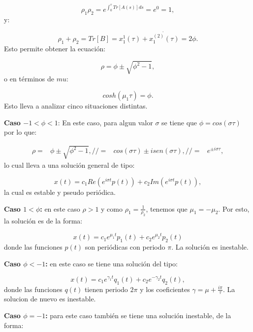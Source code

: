 \documentclass[a4paper,10pt]{report}
\begin{document}
\begin{equation}
\rho_1 \rho_2 = e^{\int_0^\tau Tr[A(s)]ds} = e^0 = 1,
\end{equation} y:

\begin{equation}
\rho_1 + \rho_2 = Tr[B] =x_1^1(\tau)+ \dot{x_1^{(2)}(\tau)} = 2\phi.
\end{equation} Esto permite obtener la ecuación:

\begin{equation}
\rho = \phi \pm \sqrt{\phi^2 -1},
\end{equation} o en términos de $mu$:

\begin{equation}
cosh(\mu_1 \tau) = \phi.
\end{equation} Esto lleva a analizar cinco situaciones distintas.

\textbf{Caso $ -1 < \phi < 1$}: En este caso, para algun valor $\sigma$ se tiene que $\phi = cos(\sigma \tau)$ por lo que:

\begin{align*}
\rho =& \phi \pm \sqrt{\phi^2 -1},//
=& cos(\sigma \tau) \pm isen(\sigma \tau), //
=& e^{\pm i\sigma \tau},
\end{align*} lo cual lleva a una solución general de tipo:

\begin{equation}
x(t) = c_1 Re(e^{i\sigma t} p(t)) + c_2 Im(e^{i\sigma t} p(t)),
\end{equation} la cual es estable y pseudo periódica.

\textbf{Caso $1 < \phi$:} en este caso $\rho > 1$ y como $\rho_1 = \frac{1}{\rho_2}$, tenemos que $\mu_1 = -\mu_2$. Por esto, la solución es de la forma:

\begin{equation}
x(t) = c_1 e^{\mu_1 t}p_1(t) + c_2 e^{\mu_2 t}p_2(t)
\end{equation} donde las funciones $p(t)$ son periódicas con periodo $\pi$. La solución es inestable.

\textbf{Caso $\phi < -1$:} en este caso se tiene una solución del tipo:

\begin{equation}
x(t) =c_1 e^{\gamma_1 t}q_1(t) + c_2 e^{-\gamma_2 t}q_2(t),
\end{equation} donde las funciones $q(t)$ tienen periodo $2\pi$ y los coeficientes $\gamma = \mu + \frac{i\pi}{\tau}$. La solucion de nuevo es inestable.

\textbf{Caso $\phi = -1$:} para este caso también se tiene una solución inestable, de la forma:
\end{document}
